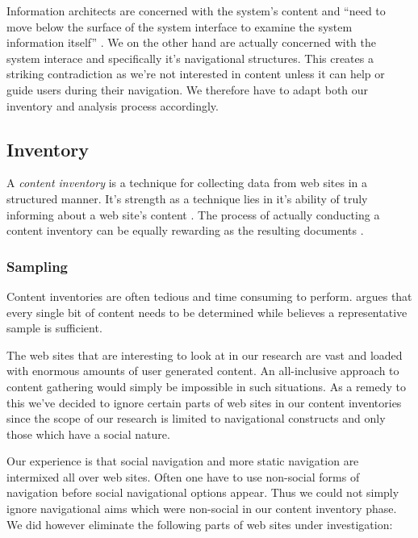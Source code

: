 Information architects are concerned with
the system's content and ``need to move below the surface of the system
interface to examine the system information itself'' \citep[p.~94]{batley07}.
We on the other hand are actually concerned with the system interace and
specifically it's navigational structures. This creates a striking
contradiction as we're not interested in content unless it can help or
guide users during their navigation. We therefore have to adapt
both our inventory and analysis process accordingly.

\subsection{Inventory}

A \emph{content inventory} is a technique for collecting data from web sites
in a structured manner. It's strength as a technique lies in it's ability of
truly informing about a web site's content \citep{wodtke02}. The process of
actually conducting a content inventory can be equally rewarding as the
resulting documents \citep{veen02}.

\subsubsection{Sampling}
\label{section:methodology.content.analysis.sampling}

Content inventories are often tedious and time consuming to perform.
\citet[p.~267]{wodtke02} argues that every single bit of content needs to be
determined while \citet[p.~241]{morville06} believes a representative sample
is sufficient.

The web sites that are interesting to look at in our research are vast and
loaded with enormous amounts of user generated content. An all-inclusive
approach to content gathering would simply be impossible in such situations.
As a remedy to this we've decided to ignore certain parts of web sites in our
content inventories since the scope of our research is limited to navigational
constructs and only those which have a social nature.

Our experience is that social navigation and more static navigation are
intermixed all over web sites. Often one have to use non-social forms of
navigation before social navigational options appear. Thus we could not simply
ignore navigational aims which were non-social in our content inventory phase.
We did however eliminate the following parts of web sites under investigation:

